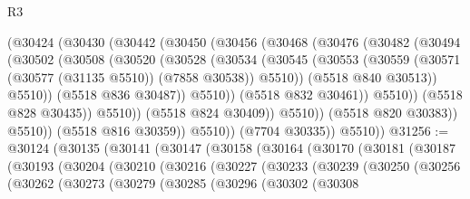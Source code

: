 \begin{lexlean}{R3}
\begin{coremodule}
                      (@30424
                        (@30430
                          (@30442
                            (@30450
                              (@30456
                                (@30468
                                  (@30476
                                    (@30482
                                      (@30494
                                        (@30502
                                          (@30508
                                            (@30520
                                              (@30528
                                                (@30534
                                                  (@30545
                                                    (@30553
                                                      (@30559
                                                        (@30571
                                                          (@30577 (@31135 @5510))
                                                          (@7858 @30538))
                                                        @5510))
                                                    (@5518 @840 @30513))
                                                  @5510))
                                              (@5518 @836 @30487))
                                            @5510))
                                        (@5518 @832 @30461))
                                      @5510))
                                  (@5518 @828 @30435))
                                @5510))
                            (@5518 @824 @30409))
                          @5510))
                      (@5518 @820 @30383))
                    @5510))
                (@5518 @816 @30359))
              @5510))
          (@7704 @30335))
        @5510))
@31256 := @30124
    (@30135
      (@30141
        (@30147
          (@30158
            (@30164
              (@30170
                (@30181
                  (@30187
                    (@30193
                      (@30204
                        (@30210
                          (@30216
                            (@30227
                              (@30233
                                (@30239
                                  (@30250
                                    (@30256
                                      (@30262
                                        (@30273
                                          (@30279
                                            (@30285
                                              (@30296
                                                (@30302
                                                  (@30308

\end{coremodule}
\end{lexlean}
